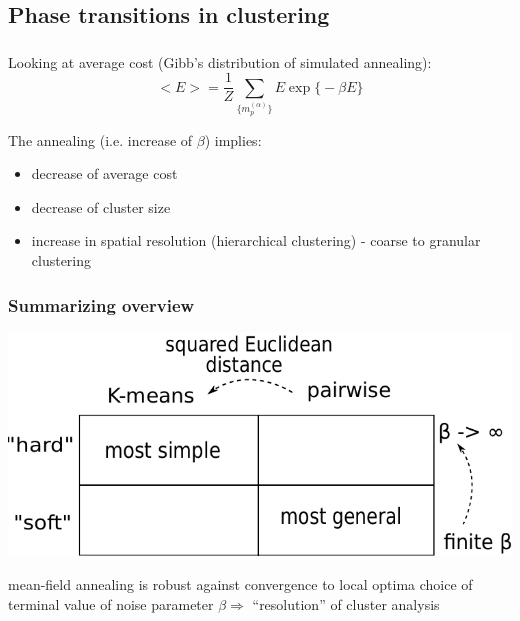 \subsection{Phase transitions in clustering}

\begin{frame}[shrink=8] \frametitle{\subsecname}


Looking at average cost (Gibb's distribution of simulated annealing):
$$
	\big< E \big> = \frac{1}{Z} \sum\limits_{\big\{ m_p^{(\alpha)} \big\}}
	E \exp \big\{ -\beta E \big\}
$$

The annealing (i.e. increase of $\beta$) implies:
\begin{itemize}
  \item decrease of average cost 
  \item decrease of cluster size 
  \item increase in spatial resolution  (hierarchical clustering) - coarse to granular clustering
\end{itemize}

\end{frame}

\begin{frame} \frametitle{Summarizing overview}
\begin{center}\includegraphics[scale=0.85]{img/section4_fig6a}
\end{center}
\begin{itemize}
	\itr mean-field annealing is robust against convergence to local optima
	\itr choice of terminal value of noise parameter $\beta \Rightarrow$ ``resolution''
		of cluster analysis
\end{itemize}
\end{frame}
